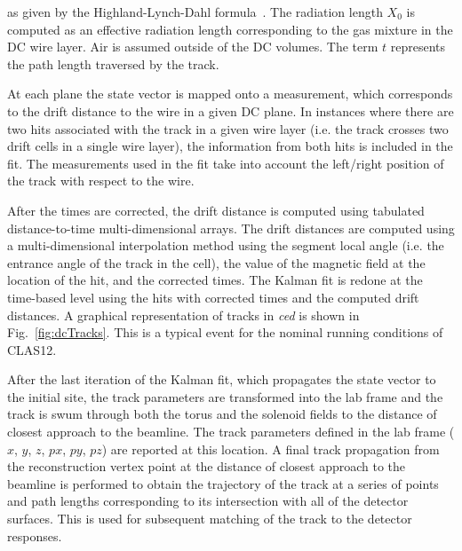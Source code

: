 \noindent
as given by the Highland-Lynch-Dahl formula~\cite{Highland-Lynch-Dahl}. The radiation length $X_0$ is computed
as an effective radiation length corresponding to the gas mixture in the DC wire layer. Air is assumed outside of
the DC volumes. The term $t$ represents the path length traversed by the track.

At each plane the state vector is mapped onto a measurement, which corresponds to the drift distance to the wire
in a given DC plane.  In instances where there are two hits associated with the track in a given wire layer (i.e. the
track crosses two drift cells in a single wire layer), the information from both hits is included in the fit. The
measurements
used in the fit take into account the left/right position of the track with respect to the wire.


After the times are corrected, the drift distance is computed using tabulated distance-to-time multi-dimensional
arrays. The drift distances are computed using a multi-dimensional interpolation method using the segment local
angle (i.e. the entrance angle of the track in the cell), the value of the magnetic field at the location of the hit, and
the corrected times. The Kalman fit is redone at the time-based level using the hits with corrected times and the
computed drift distances. A graphical representation of tracks in {\it ced} is shown in Fig.~\ref{fig:dcTracks}. This
is a typical event for the nominal running conditions of CLAS12. 

After the last iteration of the Kalman fit, which propagates the state vector to the initial site, the track parameters
are transformed into the lab frame and the track is swum through both the torus and the solenoid fields to the
distance of closest approach to the beamline. The track parameters defined in the lab frame ($x$, $y$, $z$, $px$,
$py$, $pz$) are reported at this location. A final track propagation from the reconstruction vertex point at the
distance of closest approach to the beamline is performed to obtain the trajectory of the track at a series of points
and path lengths corresponding to its intersection with all of the detector surfaces. This is used for subsequent
matching of the track to the detector responses.

